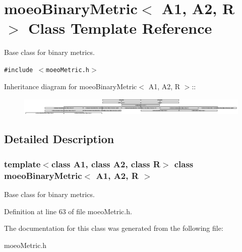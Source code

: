\section{moeo\-Binary\-Metric$<$ A1, A2, R $>$ Class Template Reference}
\label{classmoeoBinaryMetric}
Base class for binary metrics.  


{\tt \#include $<$moeo\-Metric.h$>$}

Inheritance diagram for moeo\-Binary\-Metric$<$ A1, A2, R $>$::\begin{figure}[H]
\begin{center}
\leavevmode
\includegraphics[height=0.853659cm]{classmoeoBinaryMetric}
\end{center}
\end{figure}


\subsection{Detailed Description}
\subsubsection*{template$<$class A1, class A2, class R$>$ class moeo\-Binary\-Metric$<$ A1, A2, R $>$}

Base class for binary metrics. 



Definition at line 63 of file moeo\-Metric.h.

The documentation for this class was generated from the following file:\begin{CompactItemize}
\item 
moeo\-Metric.h\end{CompactItemize}
